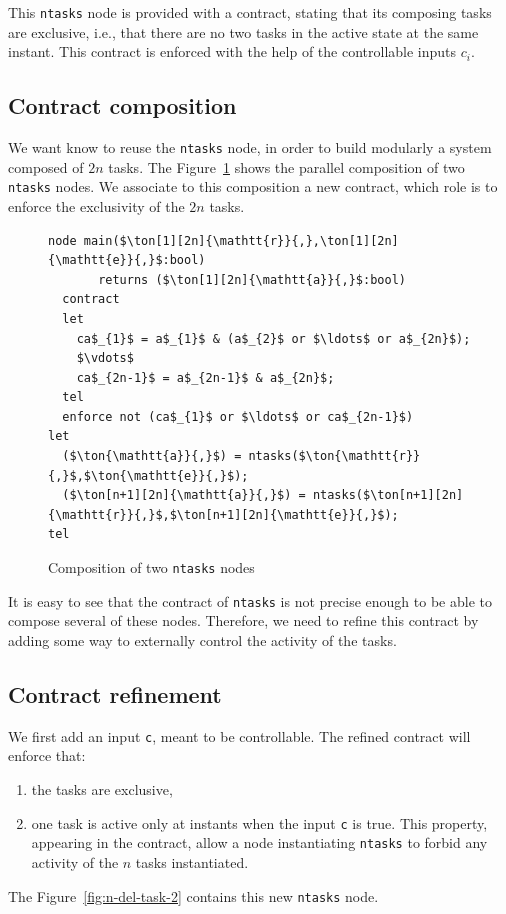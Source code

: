 \documentclass[a4paper]{article}
\begin{document}
This \texttt{ntasks} node is provided with a contract, stating that its
composing tasks are exclusive, i.e., that there are no two tasks in the active
state at the same instant. This contract is enforced with the help of the
controllable inputs $c_i$.

\subsection{Contract composition}
\label{sec:contract-composition}

We want know to reuse the \texttt{ntasks} node, in order to build modularly a
system composed of $2n$ tasks. The Figure~\ref{fig:2n-del-task} shows the
parallel composition of two \texttt{ntasks} nodes. We associate to this
composition a new contract, which role is to enforce the exclusivity of the $2n$
tasks.

\begin{figure}[htb]
\begin{lstlisting}
node main($\ton[1][2n]{\mathtt{r}}{,},\ton[1][2n]{\mathtt{e}}{,}$:bool)
       returns ($\ton[1][2n]{\mathtt{a}}{,}$:bool)
  contract
  let
    ca$_{1}$ = a$_{1}$ & (a$_{2}$ or $\ldots$ or a$_{2n}$);
    $\vdots$
    ca$_{2n-1}$ = a$_{2n-1}$ & a$_{2n}$;
  tel
  enforce not (ca$_{1}$ or $\ldots$ or ca$_{2n-1}$)
let
  ($\ton{\mathtt{a}}{,}$) = ntasks($\ton{\mathtt{r}}{,}$,$\ton{\mathtt{e}}{,}$); 
  ($\ton[n+1][2n]{\mathtt{a}}{,}$) = ntasks($\ton[n+1][2n]{\mathtt{r}}{,}$,$\ton[n+1][2n]{\mathtt{e}}{,}$); 
tel
\end{lstlisting}
\caption{Composition of two \texttt{ntasks} nodes}
\label{fig:2n-del-task}
\end{figure}

It is easy to see that the contract of \texttt{ntasks} is not precise enough to
be able to compose several of these nodes. Therefore, we need to refine this
contract by adding some way to externally control the activity of the tasks.

\subsection{Contract refinement}
\label{sec:contract-refinement}

We first add an input \texttt{c}, meant to be controllable. The refined contract
will enforce that:
\begin{enumerate}
\item the tasks are exclusive,
\item one task is active only at instants when the input \texttt{c} is
  true. This property, appearing in the contract, allow a node instantiating
  \texttt{ntasks} to forbid any activity of the $n$ tasks instantiated.
\end{enumerate}
The Figure~\ref{fig:n-del-task-2} contains this new \texttt{ntasks} node.
\end{document}
